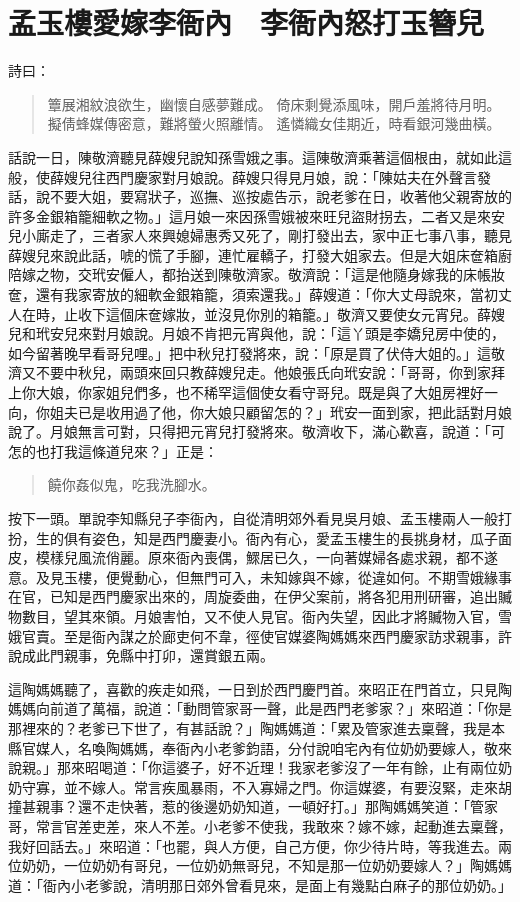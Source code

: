 
\chapter{孟玉樓愛嫁李衙內　李衙內怒打玉簪兒}

詩曰：
\begin{quote}
簟展湘紋浪欲生，幽懷自感夢難成。
倚床剩覺添風味，開戶羞將待月明。
擬倩蜂媒傳密意，難將螢火照離情。
遙憐織女佳期近，時看銀河幾曲橫。
\end{quote}

話說一日，陳敬濟聽見薛嫂兒說知孫雪娥之事。這陳敬濟乘著這個根由，就如此這般，使薛嫂兒往西門慶家對月娘說。薛嫂只得見月娘，說：「陳姑夫在外聲言發話，說不要大姐，要寫狀子，巡撫、巡按處告示，說老爹在日，收著他父親寄放的許多金銀箱籠細軟之物。」這月娘一來因孫雪娥被來旺兒盜財拐去，二者又是來安兒小廝走了，三者家人來興媳婦惠秀又死了，剛打發出去，家中正七事八事，聽見薛嫂兒來說此話，唬的慌了手腳，連忙雇轎子，打發大姐家去。但是大姐床奩箱廚陪嫁之物，交玳安僱人，都抬送到陳敬濟家。敬濟說：「這是他隨身嫁我的床帳妝奩，還有我家寄放的細軟金銀箱籠，須索還我。」薛嫂道：「你大丈母說來，當初丈人在時，止收下這個床奩嫁妝，並沒見你別的箱籠。」敬濟又要使女元宵兒。薛嫂兒和玳安兒來對月娘說。月娘不肯把元宵與他，說：「這丫頭是李嬌兒房中使的，如今留著晚早看哥兒哩。」把中秋兒打發將來，說：「原是買了伏侍大姐的。」這敬濟又不要中秋兒，兩頭來回只教薛嫂兒走。他娘張氏向玳安說：「哥哥，你到家拜上你大娘，你家姐兒們多，也不稀罕這個使女看守哥兒。既是與了大姐房裡好一向，你姐夫已是收用過了他，你大娘只顧留怎的？」玳安一面到家，把此話對月娘說了。月娘無言可對，只得把元宵兒打發將來。敬濟收下，滿心歡喜，說道：「可怎的也打我這條道兒來？」正是：
\begin{quote}
饒你姦似鬼，吃我洗腳水。
\end{quote}

按下一頭。單說李知縣兒子李衙內，自從清明郊外看見吳月娘、孟玉樓兩人一般打扮，生的俱有姿色，知是西門慶妻小。衙內有心，愛孟玉樓生的長挑身材，瓜子面皮，模樣兒風流俏麗。原來衙內喪偶，鰥居已久，一向著媒婦各處求親，都不遂意。及見玉樓，便覺動心，但無門可入，未知嫁與不嫁，從違如何。不期雪娥緣事在官，已知是西門慶家出來的，周旋委曲，在伊父案前，將各犯用刑研審，追出贓物數目，望其來領。月娘害怕，又不使人見官。衙內失望，因此才將贓物入官，雪娥官賣。至是衙內謀之於廊吏何不韋，徑使官媒婆陶媽媽來西門慶家訪求親事，許說成此門親事，免縣中打卯，還賞銀五兩。

這陶媽媽聽了，喜歡的疾走如飛，一日到於西門慶門首。來昭正在門首立，只見陶媽媽向前道了萬福，說道：「動問管家哥一聲，此是西門老爹家？」來昭道：「你是那裡來的？老爹已下世了，有甚話說？」陶媽媽道：「累及管家進去稟聲，我是本縣官媒人，名喚陶媽媽，奉衙內小老爹鈞語，分付說咱宅內有位奶奶要嫁人，敬來說親。」那來昭喝道：「你這婆子，好不近理！我家老爹沒了一年有餘，止有兩位奶奶守寡，並不嫁人。常言疾風暴雨，不入寡婦之門。你這媒婆，有要沒緊，走來胡撞甚親事？還不走快著，惹的後邊奶奶知道，一頓好打。」那陶媽媽笑道：「管家哥，常言官差吏差，來人不差。小老爹不使我，我敢來？嫁不嫁，起動進去稟聲，我好回話去。」來昭道：「也罷，與人方便，自己方便，你少待片時，等我進去。兩位奶奶，一位奶奶有哥兒，一位奶奶無哥兒，不知是那一位奶奶要嫁人？」陶媽媽道：「衙內小老爹說，清明那日郊外曾看見來，是面上有幾點白麻子的那位奶奶。」

